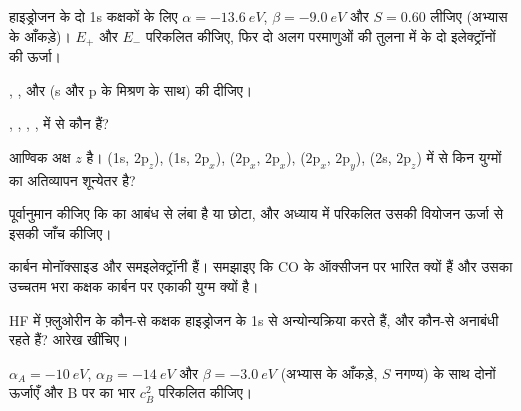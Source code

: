 \begin{exercise}[$\star$]\label{exo:b2:diatomic-mos:1}
हाइड्रोजन के दो 1s कक्षकों के लिए $\alpha = \qty{-13.6}{eV}$, $\beta = \qty{-9.0}{eV}$ और
$S = 0.60$ लीजिए (अभ्यास के आँकड़े)। $E_+$ और $E_-$ परिकलित कीजिए, फिर दो अलग परमाणुओं
की तुलना में  के दो इलेक्ट्रॉनों की ऊर्जा।
\end{exercise}

\begin{exercise}[$\star$]\label{exo:b2:diatomic-mos:2}
, ,  और  (s और p
के मिश्रण के साथ) की  दीजिए।
\end{exercise}

\begin{exercise}[$\star$]\label{exo:b2:diatomic-mos:3}
, , , ,  में से कौन  हैं?
\end{exercise}

\begin{exercise}[$\star$]\label{exo:b2:diatomic-mos:4}
आण्विक अक्ष $z$ है। (1s, $2\mathrm p_z$), (1s,
$2\mathrm p_x$), ($2\mathrm p_x$, $2\mathrm p_x$), ($2\mathrm p_x$, $2\mathrm p_y$),
(2s, $2\mathrm p_z$) में से किन युग्मों का अतिव्यापन शून्येतर है?
\end{exercise}

\begin{exercise}[$\star\star$]\label{exo:b2:diatomic-mos:5}
पूर्वानुमान कीजिए कि  का आबंध  से लंबा है या छोटा, और अध्याय में
परिकलित उसकी वियोजन ऊर्जा से इसकी जाँच कीजिए।
\end{exercise}

\begin{exercise}[$\star\star$]\label{exo:b2:diatomic-mos:6}
कार्बन मोनॉक्साइड और  समइलेक्ट्रॉनी हैं। समझाइए कि CO के 
ऑक्सीजन पर भारित क्यों हैं और उसका उच्चतम भरा कक्षक कार्बन पर एकाकी युग्म
क्यों है।
\end{exercise}

\begin{exercise}[$\star\star$]\label{exo:b2:diatomic-mos:7}
HF में फ़्लुओरीन के कौन-से कक्षक हाइड्रोजन के 1s से अन्योन्यक्रिया करते हैं, और कौन-से
अनाबंधी रहते हैं? आरेख खींचिए।
\end{exercise}

\begin{exercise}[$\star\star$]\label{exo:b2:diatomic-mos:8}
$\alpha_A = \qty{-10}{eV}$, $\alpha_B = \qty{-14}{eV}$ और $\beta = \qty{-3.0}{eV}$
(अभ्यास के आँकड़े, $S$ नगण्य) के साथ दोनों ऊर्जाएँ और B पर  का
भार $c_B^2$ परिकलित कीजिए।
\end{exercise}

